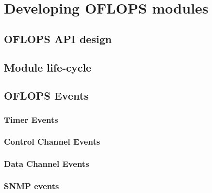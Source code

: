 \documentclass{book}
\begin{document}

  \chapter{Developing OFLOPS modules}

\section{OFLOPS API design}
\section{Module life-cycle}
\section{OFLOPS Events}
\subsection{Timer Events}
\subsection{Control Channel Events}
\subsection{Data Channel Events}
\subsection{SNMP events}

  
\end{document}
